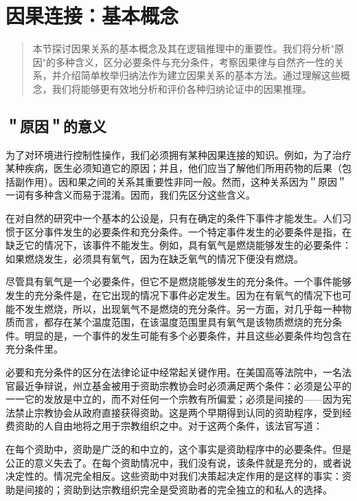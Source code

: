 \section{因果连接：基本概念}

\begin{quotation}
本节探讨因果关系的基本概念及其在逻辑推理中的重要性。我们将分析"原因"的多种含义，区分必要条件与充分条件，考察因果律与自然齐一性的关系，并介绍简单枚举归纳法作为建立因果关系的基本方法。通过理解这些概念，我们将能够更有效地分析和评价各种归纳论证中的因果推理。
\end{quotation}

\subsection{＂原因＂的意义}

为了对环境进行控制性操作，我们必须拥有某种因果连接的知识。例如，为了治疗某种疾病，医生必须知道它的原因；并且，他们应当了解他们所用药物的后果（包括副作用）。因和果之间的关系其重要性非同一般。然而，这种关系因为＂原因＂一词有多种含义而易于混淆。因而，我们先区分这些含义。

在对自然的研究中一个基本的公设是，只有在确定的条件下事件才能发生。人们习惯于区分事件发生的必要条件和充分条件。一个特定事件发生的必要条件是指，在缺乏它的情况下，该事件不能发生。例如，具有氧气是燃烧能够发生的必要条件：如果燃烧发生，必须具有氧气，因为在缺乏氧气的情况下便没有燃烧。

尽管具有氧气是一个必要条件，但它不是燃烧能够发生的充分条件。一个事件能够发生的充分条件是，在它出现的情况下事件必定发生。因为在有氧气的情况下也可能不发生燃烧，所以，出现氧气不是燃烧的充分条件。另一方面，对几乎每一种物质而言，都存在某个温度范围，在该温度范围里具有氧气是该物质燃烧的充分条件。明显的是，一个事件的发生可能有多个必要条件，并且这些必要条件均包含在充分条件里。

必要和充分条件的区分在法律论证中经常起关键作用。在美国高等法院中，一名法官最近争辩说，州立基金被用于资助宗教协会时必须满足两个条件：必须是公平的一一它的发放是中立的，而不对任何一个宗教有所偏爱；必须是间接的——因为宪法禁止宗教协会从政府直接获得资助。这是两个早期得到认同的资助程序，受到经费资助的人自由地将之用于宗教组织之中。对于这两个条件，该法官写道：

在每个资助中，资助是广泛的和中立的，这个事实是资助程序中的必要条件。但是公正的意义失去了。在每个资助情况中，我们没有说，该条件就是充分的，或者说决定性的。情况完全相反。这些资助中对我们决策起决定作用的是这样的事实：资助是间接的；资助到达宗教组织完全是受资助者的完全独立的和私人的选择。

